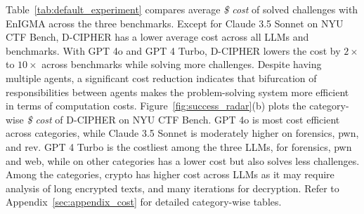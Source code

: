 Table~\ref{tab:default_experiment} compares average \textit{\$ cost} of solved challenges with EnIGMA across the three benchmarks.
Except for Claude 3.5 Sonnet on NYU CTF Bench, D-CIPHER has  a lower average cost across all LLMs and benchmarks. With GPT 4o and GPT 4 Turbo, D-CIPHER lowers the cost by $2\times$ to $10\times$ across benchmarks while solving more challenges.
Despite having multiple agents, a significant cost reduction indicates that bifurcation of responsibilities between agents makes the problem-solving system more efficient in terms of computation costs.
Figure~\ref{fig:success_radar}(b) plots the category-wise \textit{\$ cost} of D-CIPHER on NYU CTF Bench.
GPT 4o is most cost efficient across categories, while Claude 3.5 Sonnet is moderately higher on forensics, pwn, and rev. GPT 4 Turbo is the costliest among the three LLMs, for forensics, pwn and web, while on other categories has a lower cost but also solves less challenges. Among the categories, crypto has higher cost across LLMs as it may require analysis of long encrypted texts, and many iterations for decryption. Refer to Appendix~\ref{sec:appendix_cost} for detailed category-wise tables.



